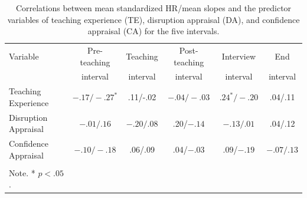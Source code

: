 \documentclass[preprint, 3p,
authoryear]{elsarticle} %
\begin{document}
\renewcommand{\arraystretch}{1.5}

\begin{table}[ht]
    \centering
    \begin{tabularx}{\textwidth}{lccccc}
        \toprule
        Variable & Pre-teaching & Teaching & Post-teaching & Interview & End \\
        & interval & interval & interval & interval & interval \\
        \midrule
        Teaching Experience & $- .17/ - .27^*$ & .11/-.02 & $- .04/-.03$ & $.24^*/-.20$ & .04/.11 \\
        Disruption Appraisal & $- .01/.16$ & $- .20/.08$ & .20/$- .14$ & $- .13/.01$ & .04/.12 \\
        Confidence Appraisal & $- .10/ - .18$ & .06/.09 & .04/$- .03$ & .09/$- .19$ & $- .07/.13$ \\
        \bottomrule \\
          Note. * $p < .05$.
    \end{tabularx}
    \caption{Correlations between mean standardized HR/mean slopes and the predictor variables of teaching experience (TE), disruption appraisal (DA), and confidence appraisal (CA) for the five intervals.}
    \label{tab_3}
\end{table}
\end{document}
